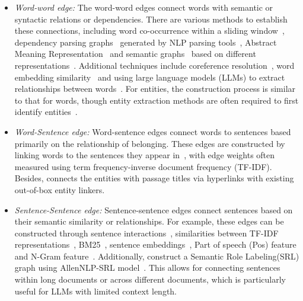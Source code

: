 \begin{itemize}[leftmargin=*]
\begin{itemize}
    \item {\it Word-word edge:} The word-word edges connect words with semantic or syntactic relations or dependencies. There are various methods to establish these connections, including word co-occurrence within a sliding window~\citep{wang2020heterogeneous, yu2021graph, zhang2020text, liu2018matching, de2018question}, dependency parsing graphs~\citep{xu2018graph2seq, tang2020integration, xu2020document, zhang2019aspect, qiu2019dynamically, tu2020select} generated by NLP parsing tools~\citep{lee2011stanford, kumawat2015pos}, Abstract Meaning Representation~\citep{xu2021dynamic, zhang2021abstract, huang2017zero, dohare2017text, xu2021exploiting} and semantic graphs~\citep{dong2024don, song2018graph, pan2020semantic} based on different representations~\citep{banarescu2013abstract, shi2019simple}. Additional techniques include coreference resolution~\citep{xu2020document, sahu2019inter, leskovec2005extracting, dhingra2018neural, song2018exploring}, word embedding similarity~\citep{wang2023docgraphlm, wang2022me} and using large language models (LLMs) to extract relationships between words~\citep{edge2024local}. For entities, the construction process is similar to that for words, though entity extraction methods are often required to first identify entities~\citep{nasar2021named, al2020named, pawar2017relation}.

    \item {\it Word-Sentence edge:} Word-sentence edges connect words to sentences based primarily on the relationship of belonging. These edges are constructed by linking words to the sentences they appear in~\citep{wang2020heterogeneous, hu2021compare, christopoulou2019connecting}, with edge weights often measured using term frequency-inverse document frequency (TF-IDF). Besides, \citet{ramesh2023single} connects the entities with passage titles via hyperlinks with existing out-of-box entity linkers.

    \item {\it Sentence-Sentence edge:} Sentence-sentence edges connect sentences based on their semantic similarity or relationships. For example, these edges can be constructed through sentence interactions~\citep{yasunaga2017graph, maheshwari2024presentations, huang2021breadth}, similarities between TF-IDF representations~\citep{li2020leveraging, chen2021sgsum}, BM25~\citep{min2019knowledge}, sentence embeddings~\citep{liu2023modeling, wang2023docgraphlm, zhang2024coarse}, Part of speech (Pos) feature and N-Gram feature~\citep{yang2018integrated}. Additionally, \citet{zheng2020srlgrn} construct a Semantic Role Labeling(SRL) graph using  AllenNLP-SRL model~\citep{shi2019simple}. This allows for connecting sentences within long documents or across different documents, which is particularly useful for LLMs with limited context length.


\end{itemize}
\end{itemize}
